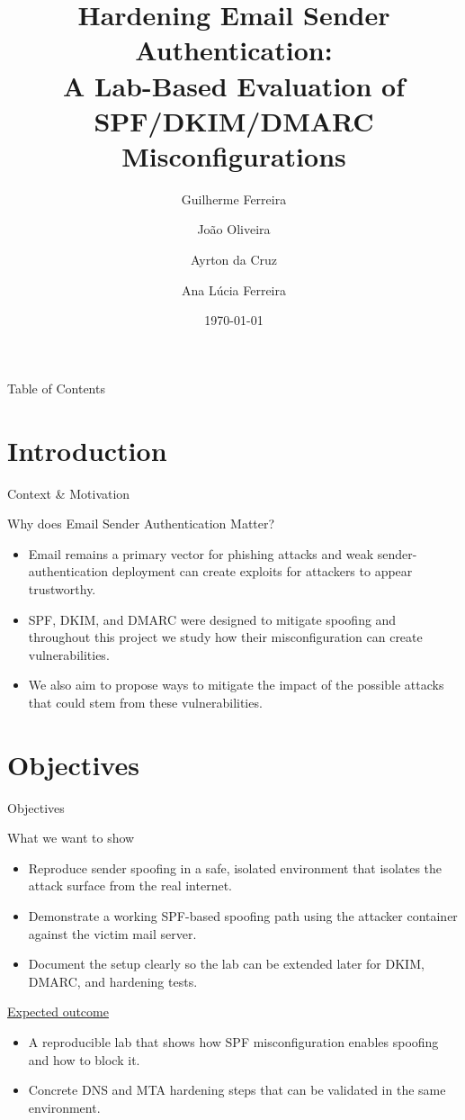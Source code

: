 \documentclass[aspectratio=169,10pt]{beamer}
\title[Hardening Email Sender Authentication]{Hardening Email Sender Authentication: \\ A Lab-Based Evaluation of SPF/DKIM/DMARC Misconfigurations}
\author[Guilherme, Jo\~ao, Ayrton, Ana]{Guilherme Ferreira \and Jo\~ao Oliveira \and Ayrton da Cruz \and Ana L\'ucia Ferreira}
\institute[FEUP]{Faculdade de Engenharia -- Universidade do Porto}
\date{\today}
\newcommand{\gitem}{\item[\textcolor{mintgreen}{\large\textbullet}]}
\begin{document}
\begin{frame}[plain]
  \titlepage
\end{frame}

\begin{frame}{Table of Contents}
  \tableofcontents
\end{frame}

\section{Introduction}
\begin{frame}{Context \& Motivation}
\begin{block}{Why does Email Sender Authentication Matter?}
\begin{itemize}
  \gitem Email remains a primary vector for phishing attacks and weak sender-authentication deployment can create exploits for attackers to appear trustworthy.
  \vspace{0.5cm}
  \gitem SPF, DKIM, and DMARC were designed to mitigate spoofing and throughout this project we study how their misconfiguration can create vulnerabilities.
  \vspace{0.5cm}  
  \gitem We also aim to propose ways to mitigate the impact of the possible attacks that could stem from these vulnerabilities.
\end{itemize}
\end{block}
\end{frame}

\section{Objectives}
\begin{frame}{Objectives}
\begin{block}{What we want to show}
\begin{itemize}
  \gitem Reproduce sender spoofing in a safe, isolated environment that isolates the attack surface from the real internet.
  \vspace{0.5cm}
  \gitem Demonstrate a working SPF-based spoofing path using the attacker container against the victim mail server.
  \vspace{0.5cm}
  \gitem Document the setup clearly so the lab can be extended later for DKIM, DMARC, and hardening tests.
\end{itemize}
\end{block}

\vfill

\begin{block}{\underline{Expected outcome}}
\begin{itemize}
  \gitem A reproducible lab that shows how SPF misconfiguration enables spoofing and how to block it.
  \vspace{0.5cm}
  \gitem Concrete DNS and MTA hardening steps that can be validated in the same environment.
\end{itemize}
\end{block}
\end{frame}
\end{document}
